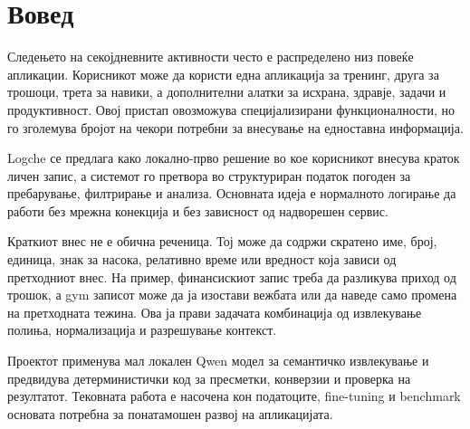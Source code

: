 \chapter{Вовед}

Следењето на секојдневните активности често е распределено низ повеќе апликации.
Корисникот може да користи една апликација за тренинг, друга за трошоци, трета за навики, а дополнителни алатки за исхрана, здравје, задачи и продуктивност.
Овој пристап овозможува специјализирани функционалности, но го зголемува бројот на чекори потребни за внесување на едноставна информација.

Logche се предлага како локално-прво решение во кое корисникот внесува краток личен запис, а системот го претвора во структуриран податок погоден за пребарување, филтрирање и анализа.
Основната идеја е нормалното логирање да работи без мрежна конекција и без зависност од надворешен сервис.

Краткиот внес не е обична реченица.
Тој може да содржи скратено име, број, единица, знак за насока, релативно време или вредност која зависи од претходниот внес.
На пример, финансискиот запис треба да разликува приход од трошок, а gym записот може да ја изостави вежбата или да наведе само промена на претходната тежина.
Ова ја прави задачата комбинација од извлекување полиња, нормализација и разрешување контекст.

Проектот применува мал локален Qwen модел за семантичко извлекување и предвидува детерминистички код за пресметки, конверзии и проверка на резултатот.
Тековната работа е насочена кон податоците, fine-tuning и benchmark основата потребна за понатамошен развој на апликацијата.
